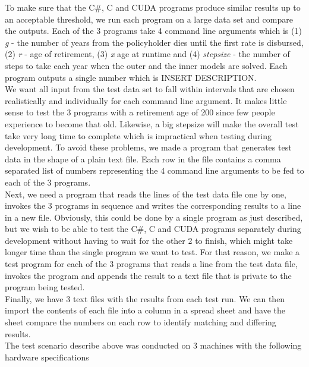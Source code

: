 To make sure that the C\#, C and CUDA programs produce similar results up to an acceptable threshold, we run each program on a large data set and compare the outputs. Each of the 3 programs take 4 command line arguments which is (1) \emph{g} - the number of years from the policyholder dies until the first rate is disbursed, (2) \emph{r} -  age of retirement, (3) \emph{x} age at runtime and (4) \emph{stepsize} - the number of steps to take each year when the outer and the inner models are solved. Each program outputs a single number which is INSERT DESCRIPTION. \\

We want all input from the test data set to fall within intervals that are chosen realistically and individually for each command line argument. It makes little sense to test the 3 programs with a retirement age of 200 since few people experience to become that old. Likewise, a big stepsize will make the overall test take very long time to complete which is impractical when testing during development. To avoid these problems, we made a program that generates test data in the shape of a plain text file. Each row in the file contains a comma separated list of numbers representing the 4 command line arguments to be fed to each of the 3 programs. \\

Next, we need a program that reads the lines of the test data file one by one, invokes the 3 programs in sequence and writes the corresponding results to a line in a new file. Obviously, this could be done by a single program as just described, but we wish to be able to test the C\#, C and CUDA programs separately during development without having to wait for the other 2 to finish, which might take longer time than the single program we want to test. For that reason, we make a test program for each of the 3 programs that reads a line from the test data file, invokes the program and appends the result to a text file that is private to the program being tested. \\

Finally, we have 3 text files with the results from each test run. We can then import the contents of each file into a column in a spread sheet and have the sheet compare the numbers on each row to identify matching and differing results. \\

The test scenario describe above was conducted on 3 machines with the following hardware specifications

